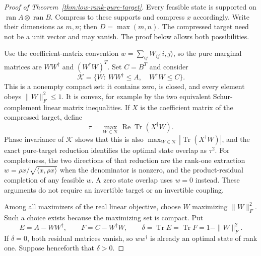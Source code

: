 \begin{proof}[Proof of Theorem~\ref{thm:low-rank-pure-target}]
Every feasible state is supported on
$\operatorname{ran}A\otimes\operatorname{ran}B$. Compress to these
supports and compress $x$ accordingly. Write their dimensions as $m,n$;
then $D=\max(m,n)$. The compressed target need not be a unit vector and
may vanish. The proof below allows both possibilities.

Use the coefficient-matrix convention
$w=\sum_{ij}W_{ij}|i,j\rangle$, so the pure marginal matrices are
$WW^\dagger$ and $(W^\dagger W)^T$. Set $C=B^T$ and consider
\[
 \mathcal K=\{W:\ WW^\dagger\le A,\quad W^\dagger W\le C\}.
\]
This is a nonempty compact set: it contains zero, is closed, and every
element obeys $\|W\|_F^2\le1$. It is convex, for example by the two
equivalent Schur-complement linear matrix inequalities. If $X$ is the
coefficient matrix of the compressed target, define
\[
 \tau=\max_{W\in\mathcal K}\operatorname{Re}\operatorname{Tr}(X^\dagger W).
\]
Phase invariance of $\mathcal K$ shows that this is also
$\max_{W\in\mathcal K}|\operatorname{Tr}(X^\dagger W)|$, and the exact
pure-target reduction identifies the optimal state overlap as $\tau^2$.
For completeness, the two directions of that reduction are the
rank-one extraction $w=\rho x/\sqrt{\langle x,\rho x\rangle}$ when the
denominator is nonzero, and the product-residual completion of any
feasible $w$. A zero state overlap uses $w=0$ instead. These arguments
do not require an invertible target or an invertible coupling.

Among all maximizers of the real linear objective, choose $W$ maximizing
$\|W\|_F^2$. Such a choice exists because the maximizing set is compact.
Put
\[
 E=A-WW^\dagger,\qquad F=C-W^\dagger W,
 \qquad \delta=\operatorname{Tr}E=\operatorname{Tr}F=1-\|W\|_F^2.
\]
If $\delta=0$, both residual matrices vanish, so $ww^\dagger$ is already
an optimal state of rank one. Suppose henceforth that $\delta>0$.


\end{proof}
